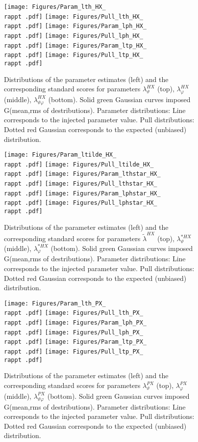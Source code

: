 \documentclass[12pt]{article}
\newcommand{\lamthHX}{\lambda^{\scriptscriptstyle HX}_\vartheta}
\newcommand{\lamphHX}{\lambda^{\scriptscriptstyle HX}_\varphi}
\newcommand{\lamthphHX}{\lambda^{\scriptscriptstyle HX}_{\vartheta \varphi}}
\newcommand{\lamtildeHX}{\tilde{\lambda}^{\scriptscriptstyle HX}}
\newcommand{\lamthstarHX}{\lambda^{* \scriptscriptstyle HX}_\vartheta}
\newcommand{\lamphstarHX}{\lambda^{* \scriptscriptstyle HX}_\varphi}
\newcommand{\lamthPX}{\lambda^{\scriptscriptstyle PX}_\vartheta}
\newcommand{\lamphPX}{\lambda^{\scriptscriptstyle PX}_\varphi}
\newcommand{\lamthphPX}{\lambda^{\scriptscriptstyle PX}_{\vartheta \varphi}}
\providecommand{\rappt}[1]{rap1pt1cpm1}%
\begin{document}
\begin{figure}[htbp]
\centering
\texttt{[image: Figures/Param\_lth\_HX\_\\rappt .pdf]}
\texttt{[image: Figures/Pull\_lth\_HX\_\\rappt .pdf]}
\texttt{[image: Figures/Param\_lph\_HX\_\\rappt .pdf]}
\texttt{[image: Figures/Pull\_lph\_HX\_\\rappt .pdf]}
\texttt{[image: Figures/Param\_ltp\_HX\_\\rappt .pdf]}
\texttt{[image: Figures/Pull\_ltp\_HX\_\\rappt .pdf]}
\caption{Distributions of the parameter estimates (left) and the corresponding
standard scores for parameters $\lamthHX$ (top), $\lamphHX$ (middle),
$\lamthphHX$ (bottom). Solid green Gaussian curves imposed G(mean,rms of
destributions). Parameter distributions: Line corresponds to the injected parameter value.
Pull distributions: Dotted red Gaussian corresponds to the expected
(unbiased) distribution.}
\end{figure}
\clearpage

\begin{figure}[htbp]
\centering
\texttt{[image: Figures/Param\_ltilde\_HX\_\\rappt .pdf]}
\texttt{[image: Figures/Pull\_ltilde\_HX\_\\rappt .pdf]}
\texttt{[image: Figures/Param\_lthstar\_HX\_\\rappt .pdf]}
\texttt{[image: Figures/Pull\_lthstar\_HX\_\\rappt .pdf]}
\texttt{[image: Figures/Param\_lphstar\_HX\_\\rappt .pdf]}
\texttt{[image: Figures/Pull\_lphstar\_HX\_\\rappt .pdf]}
\caption{Distributions of the parameter estimates (left) and the corresponding
standard scores for parameters $\lamtildeHX$ (top), $\lamthstarHX$ (middle),
$\lamphstarHX$ (bottom). Solid green Gaussian curves imposed G(mean,rms of
destributions). Parameter distributions: Line corresponds to the injected parameter value.
Pull distributions: Dotted red Gaussian corresponds to the expected
(unbiased) distribution.}
\end{figure}
\clearpage









\begin{figure}[htbp]
\centering
\texttt{[image: Figures/Param\_lth\_PX\_\\rappt .pdf]}
\texttt{[image: Figures/Pull\_lth\_PX\_\\rappt .pdf]}
\texttt{[image: Figures/Param\_lph\_PX\_\\rappt .pdf]}
\texttt{[image: Figures/Pull\_lph\_PX\_\\rappt .pdf]}
\texttt{[image: Figures/Param\_ltp\_PX\_\\rappt .pdf]}
\texttt{[image: Figures/Pull\_ltp\_PX\_\\rappt .pdf]}
\caption{Distributions of the parameter estimates (left) and the corresponding
standard scores for parameters $\lamthPX$ (top), $\lamphPX$ (middle),
$\lamthphPX$ (bottom). Solid green Gaussian curves imposed G(mean,rms of
destributions). Parameter distributions: Line corresponds to the injected parameter value.
Pull distributions: Dotted red Gaussian corresponds to the expected
(unbiased) distribution.}
\end{figure}
\clearpage
\end{document}
